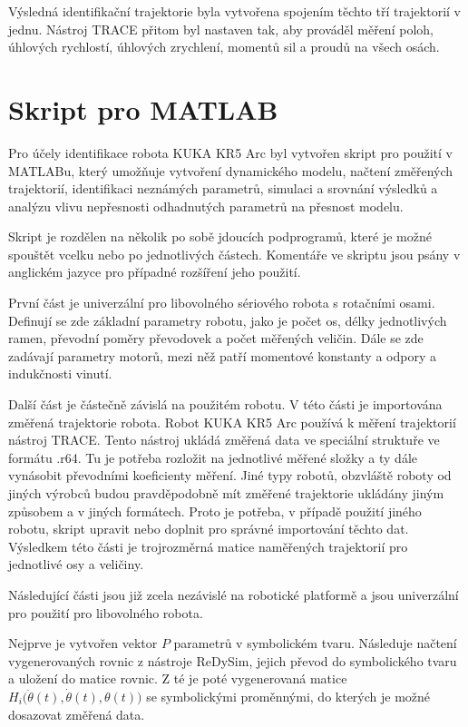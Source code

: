 Výsledná identifikační trajektorie byla vytvořena spojením těchto tří trajektorií v jednu. Nástroj TRACE přitom byl nastaven tak, aby prováděl měření poloh, úhlových rychlostí, úhlových zrychlení, momentů sil a proudů na všech osách. 

\section{Skript pro MATLAB}

Pro účely identifikace robota KUKA KR5 Arc byl vytvořen skript pro použití v MATLABu, který umožňuje vytvoření dynamického modelu, načtení změřených trajektorií, identifikaci neznámých parametrů, simulaci a srovnání výsledků a analýzu vlivu nepřesnosti odhadnutých parametrů na přesnost modelu.

Skript je rozdělen na několik po sobě jdoucích podprogramů, které je možné spouštět vcelku nebo po jednotlivých částech. Komentáře ve skriptu jsou psány v anglickém jazyce pro případné rozšíření jeho použití.

První část je univerzální pro libovolného sériového robota s rotačními osami. Definují se zde základní parametry robotu, jako je počet os, délky jednotlivých ramen, převodní poměry převodovek a počet měřených veličin. Dále se zde zadávají parametry motorů, mezi něž patří momentové konstanty a odpory a indukčnosti vinutí. 

Další část je částečně závislá na použitém robotu. V této části je importována změřená trajektorie robota. Robot KUKA KR5 Arc používá k měření trajektorií nástroj TRACE. Tento nástroj ukládá změřená data ve speciální struktuře ve formátu .r64. Tu je potřeba rozložit na jednotlivé měřené složky a ty dále vynásobit převodními koeficienty měření. Jiné typy robotů, obzvláště roboty od jiných výrobců budou pravděpodobně mít změřené trajektorie ukládány jiným způsobem a v jiných formátech. Proto je potřeba, v případě použití jiného robotu, skript upravit nebo doplnit pro správné importování těchto dat. Výsledkem této části je trojrozměrná matice naměřených trajektorií pro jednotlivé osy a veličiny. 

Následující části jsou již zcela nezávislé na robotické platformě a jsou univerzální pro použití pro libovolného robota.  

Nejprve je vytvořen vektor $P$ parametrů v symbolickém tvaru. Následuje načtení vygenerovaných rovnic z nástroje ReDySim, jejich převod do symbolického tvaru a uložení do matice rovnic. Z té je poté vygenerovaná matice $H_i\big(\ddot{\theta}(t),\dot{\theta}(t),\theta(t)\big)$ se symbolickými proměnnými, do kterých je možné dosazovat změřená data.


